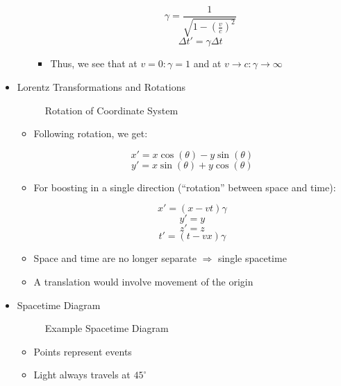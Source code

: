 \begin{itemize}
\begin{itemize}
\begin{itemize}
            $$\gamma=\frac{1}{\sqrt{1-\left( \frac{v}{c} \right)^2}}$$
            $$\Delta t'=\gamma\Delta t$$

          \item Thus, we see that at $v=0:\gamma=1$ and at $v\to c:\gamma\to\infty$

        \end{itemize}

    \end{itemize}

  \item Lorentz Transformations and Rotations

    \begin{figure}[H]
      \centering
      
      \caption{Rotation of Coordinate System}
      \label{fig:2}
    \end{figure}

    \begin{itemize}

      \item Following rotation, we get:

        $$x'=x\cos(\theta)-y\sin(\theta)$$
        $$y'=x\sin(\theta)+y\cos(\theta)$$

      \item For boosting in a single direction (``rotation'' between space and time):

        $$x'=(x-vt)\gamma$$
        $$y'=y$$
        $$z'=z$$
        $$t'=(t-vx)\gamma$$

      \item Space and time are no longer separate $\Rightarrow$ single spacetime

      \item A translation would involve movement of the origin

    \end{itemize}

  \item Spacetime Diagram

    \begin{figure}[H]
      \centering
      
      \caption{Example Spacetime Diagram}
      \label{fig:3}
    \end{figure}

    \begin{itemize}

      \item Points represent events

      \item Light always travels at $45^{\circ}$


\end{itemize}
\end{itemize}

